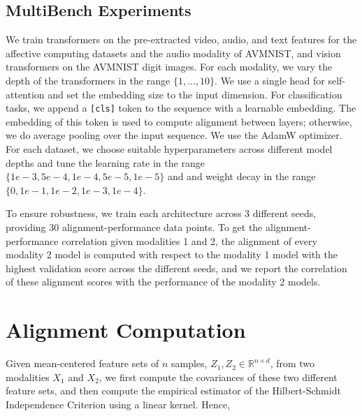 \subsection{MultiBench Experiments}

We train transformers on the pre-extracted video, audio, and text features for the affective computing datasets and the audio modality of AVMNIST, and vision transformers on the AVMNIST digit images. For each modality, we vary the depth of the transformers in the range $\{1, \ldots, 10\}$. We use a single head for self-attention and set the embedding size to the input dimension. For classification tasks, we append a \texttt{[cls]} token to the sequence with a learnable embedding. The embedding of this token is used to compute alignment between layers; otherwise, we do average pooling over the input sequence. We use the AdamW optimizer. For each dataset, we choose suitable hyperparameters across different model depths and tune the learning rate in the range $\{1e-3, 5e-4, 1e-4, 5e-5, 1e-5 \} $ and and weight decay in the range $\{0, 1e-1, 1e-2, 1e-3, 1e-4\}$.

To ensure robustness, we train each architecture across 3 different seeds, providing 30 alignment-performance data points. To get the alignment-performance correlation given modalities 1 and 2, the alignment of every modality 2 model is computed with respect to the modality 1 model with the highest validation score across the different seeds, and we report the correlation of these alignment scores with the performance of the modality 2 models.    

\section{Alignment Computation}
\label{app:sec:alignment_computation}


Given mean-centered feature sets of \(n\) samples, \(Z_1, Z_2 \in \mathbb{R}^{n \times d}\), from two modalities \(X_1\) and \(X_2\), we first compute the covariances of these two different feature sets, and then compute the empirical estimator of the Hilbert-Schmidt Independence Criterion \cite{gretton2005measuring} using a linear kernel. Hence,

